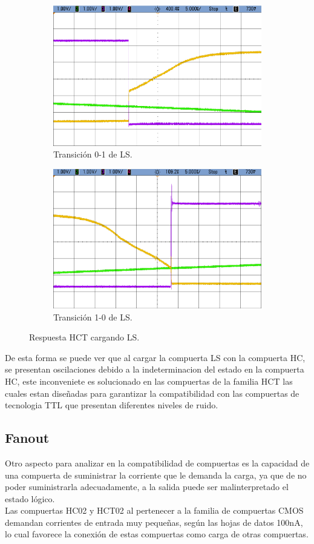 \begin{figure}[H]
\begin{subfigure}{.5\textwidth}
  \centering
  \includegraphics[width=.8\linewidth]{figs/EJ2/LS_HCT_0_1.png}  
  \caption{Transici\'on 0-1 de LS.}
  \label{ej2_fig:LS_HCT_01}
\end{subfigure}
\begin{subfigure}{.5\textwidth}
  \centering
  \includegraphics[width=.8\linewidth]{figs/EJ2/LS_HCT_1_0.png}  
  \caption{Transici\'on 1-0 de LS.}
  \label{ej2_fig:LS_HCT_01}
\end{subfigure}
\caption{Respuesta HCT cargando LS.}
\label{ej2_fig:LS_HCT}
\end{figure}

De esta forma se puede ver que al cargar la compuerta LS con la compuerta HC, se presentan oscilaciones debido a la indeterminacion del estado en la compuerta HC, este inconveniete es solucionado en las compuertas de la familia HCT las cuales estan diseñadas para garantizar la compatibilidad con las compuertas de tecnologia TTL que presentan diferentes niveles de ruido.\\
\subsection{Fanout}
Otro aspecto para analizar en la compatibilidad de compuertas es la capacidad de una compuerta de suministrar la corriente que le demanda la carga, ya que de no poder suministrarla adecuadamente, a la salida puede ser malinterpretado el estado l\'ogico.\\
Las compuertas HC02 y HCT02 al pertenecer a la familia de compuertas CMOS demandan corrientes de entrada muy pequeñas, seg\'un las hojas de datos 100nA, lo cual favorece la conexi\'on de estas compuertas como carga de otras compuertas.

